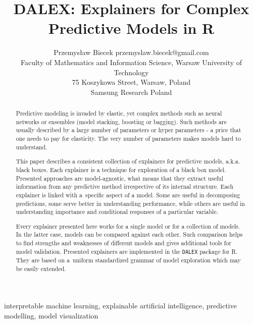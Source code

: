 \documentclass[twoside,11pt]{article}
\begin{document}
\title{DALEX: Explainers for Complex Predictive Models in R}

\author{\name Przemys\l{}aw Biecek \email przemyslaw.biecek@gmail.com \\
       \addr Faculty of Mathematics and Information Science, Warsaw University of Technology\\
       75 Koszykowa Street, Warsaw, Poland\\
       Samsung Research Poland}



\maketitle

\begin{abstract}%
Predictive modeling is invaded by elastic, yet complex methods such as neural networks or ensembles (model stacking, boosting or bagging). Such methods are usually described by a large number of parameters or hyper parameters - a price that one needs to pay for elasticity. The very number  of parameters makes models hard to understand. 

This paper describes a consistent collection of explainers for predictive models, a.k.a. black boxes. Each explainer is a technique for exploration of a black box model. Presented approaches are model-agnostic, what means that they extract useful information from any predictive method irrespective of its internal structure. Each explainer is linked with a~specific aspect of a model. Some are useful in decomposing predictions, some serve better in understanding performance, while others are useful in understanding importance and conditional responses of a particular variable.

Every explainer presented here works for a single model or for a collection of models. In the latter case, models can be compared against each other. Such comparison helps to find strengths and weaknesses of different models and gives additional tools for model validation. Presented explainers are implemented in the \texttt{DALEX} package for R. They are based on a~uniform standardized grammar of model exploration which may be easily extended. 
\end{abstract}

\begin{keywords}
interpretable machine learning, explainable artificial intelligence, predictive modelling, model visualization \end{keywords}
\end{document}
